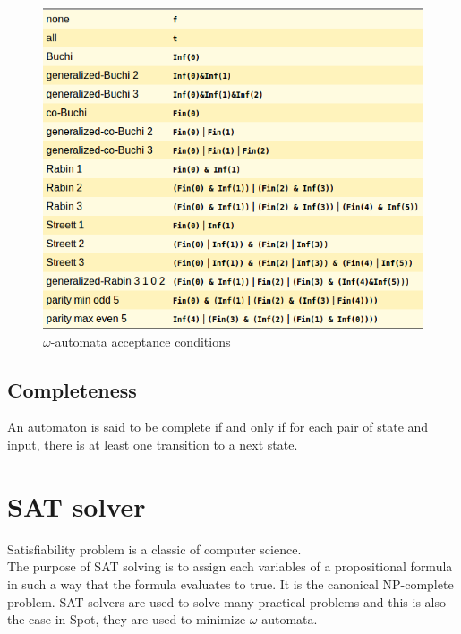 \begin{figure}[H]
 \centering
 \includegraphics[scale=0.6]{img/acc_conds.png}
 \caption{$\omega$-automata acceptance conditions~\cite{8}}
 \label{fig:acc_conds}
\end{figure}

\subsection{Completeness}
An automaton is said to be complete if and only if for each pair of state and input, there is at least one transition
to a next state.

\section{SAT solver}
Satisfiability problem is a classic of computer science.\\

The purpose of SAT solving is to assign each variables of a propositional formula in such a way that the
formula evaluates to true. It is the canonical NP-complete problem. SAT solvers are used to solve many
practical problems and this is also the case in Spot, they are used to minimize $\omega$-automata.\\


